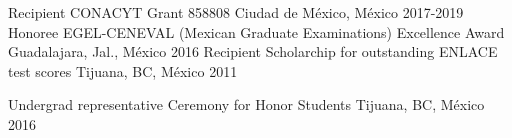 \vspace{-1.8mm}
\begin{cvhonors}
    \cvhonor
    {Recipient}
    {CONACYT Grant {\textnumero} 858808}
    {Ciudad de México, México}
    {2017-2019}
  \cvhonor
    {Honoree}
    {EGEL-CENEVAL (Mexican Graduate Examinations) Excellence Award}
    {Guadalajara, Jal., México}
    {2016}
  \cvhonor
    {Recipient}
    {Scholarchip for outstanding ENLACE test scores}
    {Tijuana, BC, México}
    {2011}
\end{cvhonors}
\vspace{-3mm}
\begin{cvhonors}
  \cvhonor
    {Undergrad representative}
    {Ceremony for Honor Students}
    {Tijuana, BC, México}
    {2016}
\end{cvhonors}

